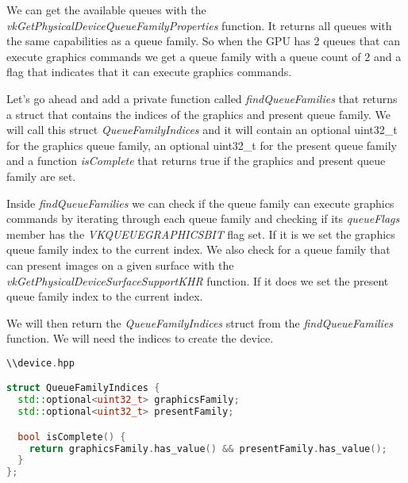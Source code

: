 \documentclass[12pt]{report} \usepackage{preamble}
\begin{document}
We can get the available queues with the \textit{vkGetPhysicalDeviceQueueFamilyProperties} function.
It returns all queues with the same capabilities as a queue family. So when the \ac{GPU} has 2 queues
that can execute graphics commands we get a queue family with a queue count of 2 and a flag that
indicates that it can execute graphics commands.

Let's go ahead and add a private function called \textit{findQueueFamilies} that returns a struct
that contains the indices of the graphics and present queue family. We will call this struct
\textit{QueueFamilyIndices} and it will contain an optional uint32\_t for the graphics queue family,
an optional uint32\_t for the present queue family and a function \textit{isComplete} that returns
true if the graphics and present queue family are set.

Inside \textit{findQueueFamilies} we can check if the queue family can execute graphics commands by iterating through each queue family
and checking if its \textit{queueFlags} member has the \textit{VK\textunderscore QUEUE\textunderscore GRAPHICS\textunderscore BIT} flag set.
If it is we set the graphics queue family index to the current index. We also check for a queue family that can present images
on a given surface with the \textit{vkGetPhysicalDeviceSurfaceSupportKHR} function. If it does we set the present queue family index
to the current index.

We will then return the \textit{QueueFamilyIndices} struct from the \textit{findQueueFamilies} function. We will need the indices
to create the device.

\begin{lstlisting}[language=C++]
\\device.hpp

struct QueueFamilyIndices {
  std::optional<uint32_t> graphicsFamily;
  std::optional<uint32_t> presentFamily;

  bool isComplete() {
    return graphicsFamily.has_value() && presentFamily.has_value();
  }
};
\end{lstlisting}
\end{document}
